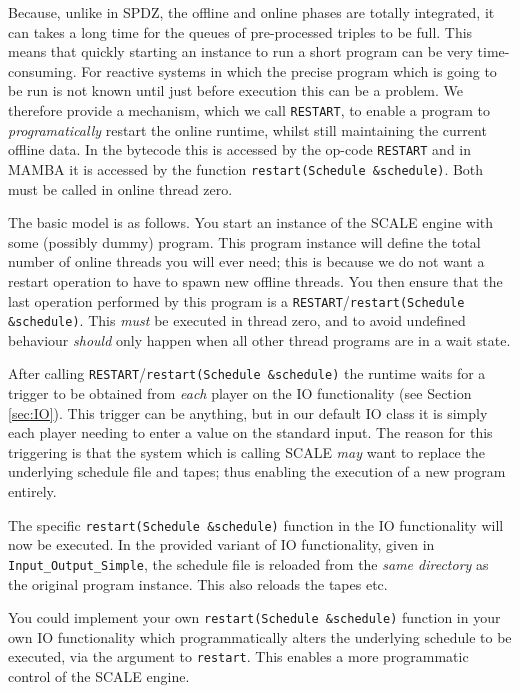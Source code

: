 \label{sec:restart}
Because, unlike in SPDZ, the offline and online phases are totally
integrated, it can takes a long time for the queues of pre-processed
triples to be full. This means that quickly starting an instance to
run a short program can be very time-consuming. For reactive systems
in which the precise program which is going to be run is not known
until just before execution this can be a problem.
We therefore provide a mechanism, which we call \verb+RESTART+, to
enable a program to {\em programatically} restart the online runtime, whilst 
still maintaining the current offline data.
In the bytecode this is accessed by the op-code \verb+RESTART+
and in MAMBA it is accessed by the function \verb+restart(Schedule &schedule)+.
Both must be called in online thread zero.

The basic model is as follows.
You start an instance of the SCALE engine with some (possibly
dummy) program. This program instance will define the total number
of online threads you will ever need; this is because we do not
want a restart operation to have to spawn new offline threads.
You then ensure that the last operation performed by this
program is a \verb+RESTART+/\verb+restart(Schedule &schedule)+.
This {\em must} be executed in thread zero, and to avoid undefined
behaviour {\em should} only happen when all other thread programs
are in a wait state.

After calling \verb+RESTART+/\verb+restart(Schedule &schedule)+
the runtime waits for a trigger to be obtained
from {\em each} player on the IO functionality (see
Section \ref{sec:IO}).
This trigger can be anything, but in our default IO class it
is simply each player needing to enter a value on the standard
input.
The reason for this triggering is that the system which is
calling SCALE {\em may} want to replace the underlying
schedule file and tapes; thus enabling the execution of
a new program entirely.

The specific \verb+restart(Schedule &schedule)+ function in the  
IO functionality will now be executed.
In the provided variant of IO functionality, given in
\verb+Input_Output_Simple+, the schedule file is reloaded 
from the {\em same directory} as the original program instance.
This also reloads the tapes etc.

You could implement your own \verb+restart(Schedule &schedule)+ function in your
own IO functionality which programmatically alters
the underlying schedule to be executed, via the argument to \verb+restart+. 
This enables a more programmatic control of the SCALE engine.

